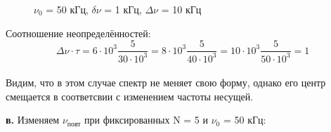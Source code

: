 \documentclass[a4paper,12pt]{article} %
\begin{document}
\begin{enumerate}
\begin{figure}[h]
\begin{minipage}[h]{0.47\linewidth}
		      \end{minipage}
		      \vfill
		      \begin{minipage}[h]{0.47\linewidth}
			       $\nu_0$ = 50 кГц, $\delta \nu$ = 1 кГц, $\Delta \nu$ = 10 кГц \\
		      \end{minipage}
		      \hfill
		      \caption{}
		      \label{ris:experimentalcorrelationsignals}
	      \end{figure}

	      Соотношение неопределённостей:
	      $$ \Delta \nu \cdot \tau = 6\cdot10^3\frac{5}{30\cdot10^3} = 8\cdot10^3\frac{5}{40\cdot10^3} = 10\cdot10^3\frac{5}{50\cdot10^3} = 1 $$\\
	      Видим, что в этом случае спектр не меняет свою форму, однако его центр смещается в соответсвии с изменением частоты несущей.


	      \newpage

	      \textbf{в.} Изменяем $\nu_\text{повт}$  при фиксированных N = 5 и $\nu_0$ = 50 кГц:


\end{enumerate}
\end{document}
